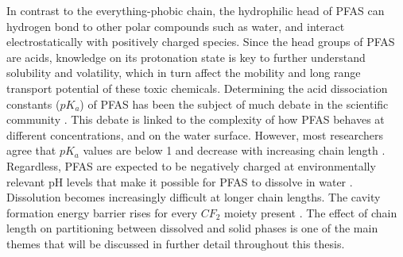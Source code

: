 In contrast to the everything-phobic chain, the hydrophilic head of PFAS can hydrogen bond to other polar compounds such as water, and interact electrostatically with positively charged species. Since the head groups of PFAS are acids, knowledge on its protonation state is key to further understand solubility and volatility, which in turn affect the mobility and long range transport potential of these toxic chemicals. Determining the acid dissociation constants (\(pK_a\)) of PFAS has been the subject of much debate in the scientific community \citep{Goss2009comment}. This debate is linked to the complexity of how PFAS behaves at different concentrations, and on the water surface. However, most researchers agree that \(pK_a\) values are below 1 and decrease with increasing chain length \citep{wang2011physchem,Reemtsma2016}. Regardless, PFAS are expected to be negatively charged at environmentally relevant pH levels that make it possible for PFAS to dissolve in water \citep{Reemtsma2016}. Dissolution becomes increasingly difficult at longer chain lengths. The cavity formation energy barrier rises for every $CF_2$ moiety present \citep{bhhatarai2011,Arp2006}. The effect of chain length on partitioning between dissolved and solid phases is one of the main themes that will be discussed in further detail throughout this thesis.

